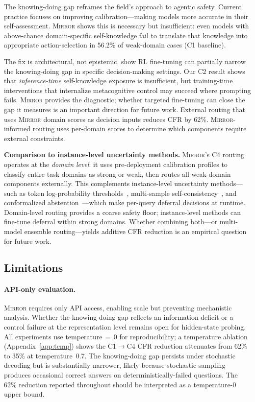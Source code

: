 \documentclass[10pt]{article}
\newcommand{\mirror}{\textsc{Mirror}}
\newcommand{\CFR}{CFR}
\begin{document}
The knowing-doing gap reframes the field's approach to agentic safety. Current
practice focuses on improving calibration---making models more accurate in their
self-assessment. \mirror{} shows this is necessary but insufficient: even models
with above-chance domain-specific self-knowledge fail to translate that knowledge into
appropriate action-selection in 56.2\% of weak-domain cases (C1 baseline).

The fix is architectural, not epistemic.
\citet{schmied2026greedy} show RL fine-tuning can partially narrow the
knowing-doing gap in specific decision-making settings. Our C2 result shows that
\emph{inference-time} self-knowledge exposure is insufficient, but training-time
interventions that internalize metacognitive control may succeed where prompting
fails. \mirror{} provides the diagnostic; whether targeted fine-tuning can close
the gap it measures is an important direction for future work.
External routing that uses \mirror{}
domain scores as decision inputs reduces \CFR{} by 62\%. \mirror{}-informed routing uses per-domain scores to determine which components require external constraints.

\textbf{Comparison to instance-level uncertainty methods.} \mirror{}'s C4 routing operates at the \textit{domain level}: it uses pre-deployment calibration profiles to classify entire task domains as strong or weak, then routes all weak-domain components externally. This complements instance-level uncertainty methods---such as token log-probability thresholds~\citep{lin2024generating}, multi-sample self-consistency~\citep{wang2023selfconsistency}, and conformalized abstention~\citep{angelopoulos2021conformal}---which make per-query deferral decisions at runtime. Domain-level routing provides a coarse safety floor; instance-level methods can fine-tune deferral within strong domains. Whether combining both---or multi-model ensemble routing---yields additive CFR reduction is an empirical question for future work.

\subsection{Limitations}

\paragraph{API-only evaluation.}
\mirror{} requires only API access, enabling scale but preventing mechanistic
analysis. Whether the knowing-doing gap reflects an information deficit or a
control failure at the representation level remains open for hidden-state probing.
All experiments use temperature$\,=\,0$ for reproducibility; a temperature ablation (Appendix~\ref{app:temp}) shows the C1$\to$C4 CFR reduction attenuates from 62\% to 35\% at temperature~0.7. The knowing-doing gap persists under stochastic decoding but is substantially narrower, likely because stochastic sampling produces occasional correct answers on deterministically-failed questions. The 62\% reduction reported throughout should be interpreted as a temperature-0 upper bound.
\end{document}
